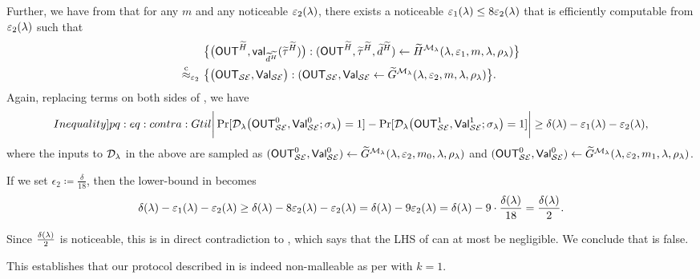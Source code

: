 Further, we have from  that for any $m$ and any noticeable $\varepsilon_2(\lambda)$, there exists a noticeable $\varepsilon_1(\lambda) \le 8\varepsilon_2(\lambda)$ that is efficiently computable from $\varepsilon_2(\lambda)$ such that
\begin{align*}
    &\big\{\big(\mathsf{OUT}^{\widetilde{H}}, \mathsf{val}_{\widetilde{d}^{\widetilde{H}}}(\widetilde{\tau}^{\widetilde{H}})\big): (\mathsf{OUT}^{\widetilde{H}}, \widetilde{\tau}^{\widetilde{H}}, \widetilde{d}^{\widetilde{H}}) \gets \widetilde{H}^{\mathcal{M}_\lambda}(\lambda, \varepsilon_1, m,\lambda,\rho_\lambda) \big\} \\
    \stackrel{\text{c}}{\approx}_{\varepsilon_2} ~& 
    \big\{\big(\mathsf{OUT}_{\mathcal{SE}}, \mathsf{Val}_{\mathcal{SE}}\big): (\mathsf{OUT}_{\mathcal{SE}}, \mathsf{Val}_{\mathcal{SE}} \gets \widetilde{G}^{\mathcal{M}_\lambda}(\lambda, \varepsilon_2, m,\lambda,\rho_\lambda) \big\}.
\end{align*}
 Again, replacing terms on both sides of , we have 
\begin{equation}\label[Inequality]{pq:eq:contra:Gtil}
    \bigg|\Pr[\mcal{D}_\secpar\big(\OUT^0_{\mcal{SE}}, \msf{Val}_{\mcal{SE}}^0; \sigma_\secpar\big)=1] - \Pr[\mcal{D}_\secpar\big(\msf{OUT}_{\mcal{SE}}^1, \msf{Val}_{\mcal{SE}}^1; \sigma_\secpar\big)=1] \bigg|\ge \delta(\secpar) -\epsilon_1(\secpar) - \epsilon_2(\secpar),
\end{equation}
where the inputs to $\mathcal{D}_\lambda$ in the above are sampled as $(\mathsf{OUT}^0_{\mathcal{SE}}, \mathsf{Val}_{\mathcal{SE}}^0) \gets \widetilde{G}^{\mathcal{M}_\lambda}(\lambda, \varepsilon_2, m_0,\lambda,\rho_\lambda)$ and $(\mathsf{OUT}^0_{\mathcal{SE}}, \mathsf{Val}_{\mathcal{SE}}^0) \gets \widetilde{G}^{\mathcal{M}_\lambda}(\lambda, \varepsilon_2, m_1,\lambda,\rho_\lambda)$.

If we set $\epsilon_2 \coloneqq \frac{\delta}{18}$, then the lower-bound in  becomes 
$$\delta(\lambda) -\varepsilon_1(\lambda) - \varepsilon_2(\lambda) \ge \delta(\lambda) -8 \varepsilon_2(\lambda) - \varepsilon_2(\lambda) = \delta(\lambda) -9  \varepsilon_2(\lambda) = \delta(\lambda) -9 \cdot \frac{\delta(\lambda)}{18}= \frac{\delta(\lambda)}{2}.$$

Since $\frac{\delta(\lambda)}{2}$ is noticeable, this is in direct contradiction to , which says that the LHS of  can at most be negligible. We conclude that  is false. 

This establishes that our protocol described in  is indeed non-malleable as per  with $k =1$.




